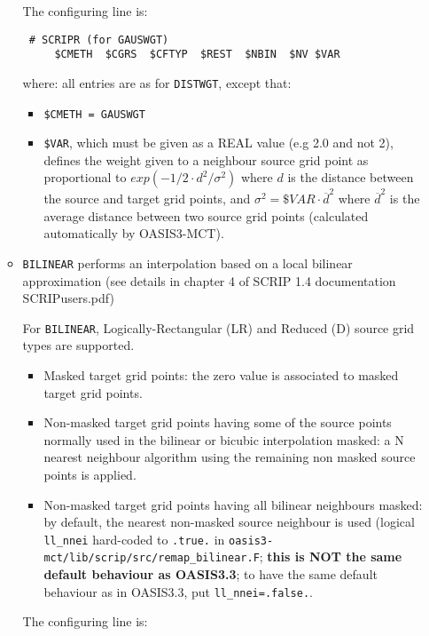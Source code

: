\begin{itemize}
\begin{itemize}
  The configuring line is:
  \begin{verbatim}
 # SCRIPR (for GAUSWGT)
     $CMETH  $CGRS  $CFTYP  $REST  $NBIN  $NV $VAR
  \end{verbatim}
\vspace{-0.5cm} 
where:
  all entries are as for  {\tt DISTWGT}, except that:
  \begin{itemize} 
   \item {\tt \$CMETH = GAUSWGT}
   \item {\tt \$VAR}, which must be given as a
    REAL value (e.g 2.0 and not 2), defines the weight given to a
    neighbour source grid point as
    proportional to $exp(-1/2 \cdot d^2/\sigma^2)$ where $d$ is the
    distance between the source and target grid points, and $\sigma^2 =
    \$VAR \cdot \overline{d}^2$ where $\overline{d}^2$ is the average
    distance between two source grid points (calculated automatically
    by OASIS3-MCT).
  \end{itemize}

  \item {\tt BILINEAR} performs an interpolation based on a local bilinear approximation
    (see details
    in chapter 4 of SCRIP 1.4 documentation SCRIPusers.pdf)

  For {\tt BILINEAR}, Logically-Rectangular (LR) and
  Reduced (D) source grid types are supported.

  \begin{itemize}  
  \item Masked target grid points: the zero value is associated to masked
  target grid points.

  \item Non-masked target grid points having some of the source points
  normally used in the bilinear or bicubic interpolation masked: a N
  nearest neighbour algorithm using the remaining non masked source
  points is applied.

 \item Non-masked target grid points having all
       bilinear neighbours masked: by default, the nearest non-masked
       source neighbour is used (logical {\tt ll\_nnei} hard-coded to
       {\tt .true.} in {\tt oasis3-mct/lib/scrip/src/remap\_bilinear.F};
       {\bf this is NOT the same default behaviour as OASIS3.3}; to
       have the same default behaviour as in OASIS3.3, put {\tt ll\_nnei=.false.}. 
  \end{itemize} 
 
  The configuring line is:


\end{itemize}
\end{itemize}

